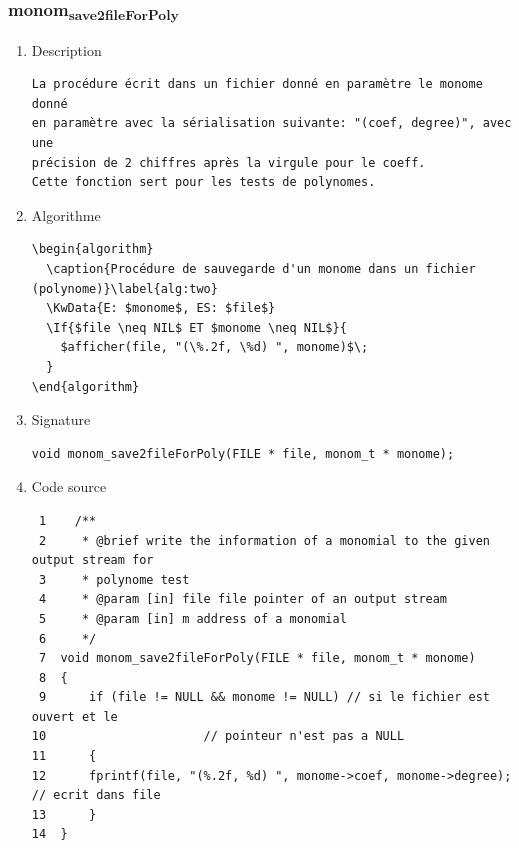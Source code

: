 \documentclass[11pt]{article}
\begin{document}
\subsubsection{monom\textsubscript{save2fileForPoly}}
\label{sec:orgaf52aea}
\begin{enumerate}
\item Description
\label{sec:orgc3b7489}

\begin{verbatim}
La procédure écrit dans un fichier donné en paramètre le monome donné
en paramètre avec la sérialisation suivante: "(coef, degree)", avec une
précision de 2 chiffres après la virgule pour le coeff.
Cette fonction sert pour les tests de polynomes.
\end{verbatim}

\item Algorithme
\label{sec:org9bbcff2}

\begin{verbatim}
\begin{algorithm}
  \caption{Procédure de sauvegarde d'un monome dans un fichier (polynome)}\label{alg:two}
  \KwData{E: $monome$, ES: $file$}
  \If{$file \neq NIL$ ET $monome \neq NIL$}{
    $afficher(file, "(\%.2f, \%d) ", monome)$\;
  }
\end{algorithm}
\end{verbatim}

\item Signature
\label{sec:org2c24aa3}

\begin{verbatim}
void monom_save2fileForPoly(FILE * file, monom_t * monome);
\end{verbatim}

\item Code source
\label{sec:org37e284f}

\begin{verbatim}
 1    /**
 2     * @brief write the information of a monomial to the given output stream for
 3     * polynome test
 4     * @param [in] file file pointer of an output stream
 5     * @param [in] m address of a monomial
 6     */
 7  void monom_save2fileForPoly(FILE * file, monom_t * monome)
 8  {
 9      if (file != NULL && monome != NULL) // si le fichier est ouvert et le
10  					// pointeur n'est pas a NULL
11      {
12  	fprintf(file, "(%.2f, %d) ", monome->coef, monome->degree); // ecrit dans file 
13      }
14  }
\end{verbatim}


\end{enumerate}
\end{document}
